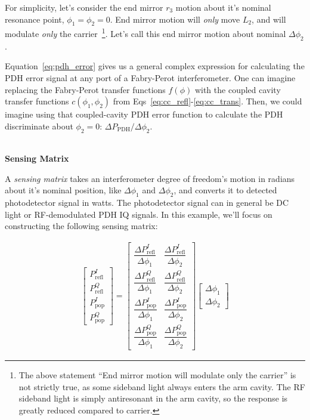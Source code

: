 \documentclass[11pt]{article}
\begin{document}
For simplicity, let's consider the end mirror $r_3$ motion about it's nominal resonance point, $\phi_1 = \phi_2 = 0$.    
End mirror motion will \textit{only} move $L_2$, and will modulate \textit{only} the carrier~\textcolor{Mahogany}{\footnote{\textcolor{Mahogany}{The above statement ``End mirror motion will modulate only the carrier'' is not strictly true, as some sideband light always enters the arm cavity.  The RF sideband light is simply antiresonant in the arm cavity, so the response is greatly reduced compared to carrier.}}}.
Let's call this end mirror motion about nominal $\Delta \phi_2$.

Equation~\ref{eq:pdh_error} gives us a general complex expression for calculating the PDH error signal at any port of a Fabry-Perot interferometer.  
One can imagine replacing the Fabry-Perot transfer functions $f(\phi)$ with the coupled cavity transfer functions $c(\phi_1,\phi_2)$ from Eqs~\ref{eq:cc_refl}-\ref{eq:cc_trans}.
Then, we could imagine using that coupled-cavity PDH error function to calculate the PDH discriminate about $\phi_2 = 0$: $\Delta P_\mathrm{PDH} / \Delta \phi_2$. 

\noindent~\\
\textbf{Sensing Matrix}

A \textit{sensing matrix} takes an interferometer degree of freedom's motion in radians about it's nominal position, 
like $\Delta \phi_1$ and $\Delta \phi_2$, 
and converts it to detected photodetector signal in watts.
The photodetector signal can in general be DC light or RF-demodulated PDH IQ signals.
In this example, we'll focus on constructing the following sensing matrix:

\begin{align}
\begin{bmatrix}
    P_\mathrm{refl}^I \\[2ex]
    P_\mathrm{refl}^Q \\[2ex]
    P_\mathrm{pop}^I \\[2ex]
    P_\mathrm{pop}^Q
\end{bmatrix} = \begin{bmatrix}
    \dfrac{\Delta P_\mathrm{refl}^I}{\Delta \phi_1} & \dfrac{\Delta P_\mathrm{refl}^I}{\Delta \phi_2} \\[2ex]
    \dfrac{\Delta P_\mathrm{refl}^Q}{\Delta \phi_1} & \dfrac{\Delta P_\mathrm{refl}^Q}{\Delta \phi_2} \\[2ex]
    \dfrac{\Delta P_\mathrm{pop}^I}{\Delta \phi_1} & \dfrac{\Delta P_\mathrm{pop}^I}{\Delta \phi_2} \\[2ex]
    \dfrac{\Delta P_\mathrm{pop}^Q}{\Delta \phi_1} & \dfrac{\Delta P_\mathrm{pop}^Q}{\Delta \phi_2}
\end{bmatrix}
\begin{bmatrix}
    \Delta \phi_1 \\[2ex]
    \Delta \phi_2
\end{bmatrix}
\end{align}
\end{document}
